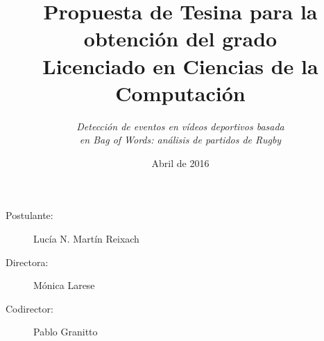 \documentclass[10pt]{article}
\begin{document}
\date{Abril de 2016}
\title{Propuesta de Tesina para la obtención del grado\\Licenciado en Ciencias de la Computación}
\author{\textit{\large Detección de eventos en vídeos deportivos basada} \\ \textit{\large en Bag of Words: análisis de partidos de Rugby}}

\maketitle

\begin{description}
  \item[Postulante:] Lucía N. Martín Reixach
  \item[Directora:] Mónica Larese
  \item[Codirector:] Pablo Granitto
\end{description}












\nocite{yang2007evaluating}
\printbibliography
\end{document}
